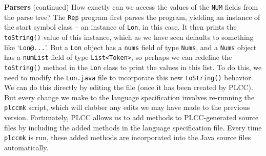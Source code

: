 \begin{minipage}[t]{\sw}
\slidenumber
\LARGE
{\bf Parsers} (continued)\exx
\emm\LightBox{\MYlonGrammarKleene}\exx
How exactly can we access the values of the \verb'NUM' fields
from the parse tree?
The \verb'Rep' program first parses the program,
yielding an instance of the start symbol class
-- an instance of \verb'Lon', in this case.
It then prints the \verb'toString()' value of this instance,
which as we have seen defaults to something like `\verb'Lon@...''.\exx
But a \verb'Lon' object has a \verb'nums' field of type \verb'Nums',
and a \verb'Nums' object has a \verb'numList' field of type \verb'List<Token>',
so perhaps we can redefine the \verb'toString()' method
in the \verb'Lon' class to print the values in this list.\exx
To do this, we need to modify the \verb'Lon.java' file
to incorporate this new \verb'toString()' behavior.
We can do this directly by editing the file
(once it has been created by PLCC).
But every change we make to the language specification involves
re-running the \verb'plccmk' script,
which will clobber any edits we may have made to the previous version.\exx
Fortunately, PLCC allows us to add methods to PLCC-generated source files
by including the added methods in the language specification file.
Every time \verb'plccmk' is run,
these added methods are incorporated
into the Java source files automatically.\exx
\end{minipage}
\clearpage
